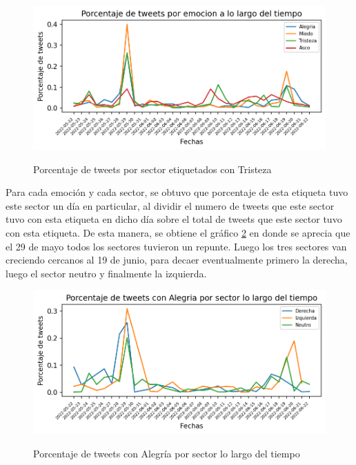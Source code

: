\begin{figure}[h]
	\caption{Porcentaje de tweets por sector etiquetados con Tristeza}
	\centering
	\includegraphics{../Images/Results/Porcentaje de tweets por emocion a lo largo del tiempo.png} 
	\label{figure:tweets_percent_tiempo}
\end{figure}



Para cada emoción y cada sector, se obtuvo que porcentaje de esta etiqueta tuvo este sector un día en particular, al dividir el numero de tweets que este sector tuvo con esta etiqueta en dicho día sobre el total de tweets que este sector tuvo con esta etiqueta. De esta manera, se obtiene el gráfico \ref{figure:tweets_percent_alegria_tiempo} en donde se aprecia que el 29 de mayo todos los sectores tuvieron un repunte. Luego los tres sectores van creciendo cercanos al 19 de junio, para decaer eventualmente primero la derecha, luego el sector neutro y finalmente la izquierda.




\begin{figure}[h]
	\caption{Porcentaje de tweets con Alegría por sector lo largo del tiempo}
	\centering
	\includegraphics{../Images/Results/Porcentaje de tweets con Alegria por sector lo largo del tiempo.png} 
	\label{figure:tweets_percent_alegria_tiempo}
\end{figure}


